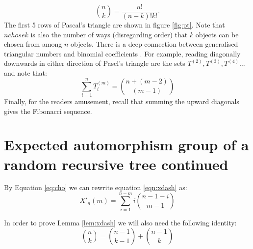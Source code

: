 \documentclass[oneside]{book} %
\theoremstyle{definition}
\numberwithin{equation}{section}
\begin{document}
\[
 {n \choose k} = \frac{n!}{(n-k)!k!}.
\]
The first 5 rows of Pascal's triangle are shown in figure \ref{fig:pt}.  Note that ${n chose k}$ is also the number of ways
(disregarding order) that $k$ objects can be chosen from among $n$ objects.  There is a deep connection between generalised
triangular numbers and binomial coefficients \cite{}. For example, reading diagonally downwards in either direction of Pascl's 
triangle are the sets $T^{(2)}, T^{(3)},T^{(4)}\dots$ and note that:
\begin{equation}\label{eq:cho}
 \sum_{i=1}^{n}T_i^{(m)} = {n + (m-2)\choose(m-1)}
\end{equation}
Finally, for the readers amusement, recall that summing the upward diagonals gives the Fibonacci sequence.

\section{Expected automorphism group of a random recursive tree continued}

By Equation \ref{eq:cho} we can rewrite equation \ref{eqn:xdash} as:
\[ X'_n(m) = \sum_{i=1}^{n-m} i  {n-1-i\choose m-1} \]


In order to prove Lemma \ref{lem:xdash} we will also need the following identity:
\begin{equation}\label{eqn:id1}
{{n}\choose{k}} = {{n-1}\choose{k-1}} + {{n-1}\choose{k}}
\end{equation}
\end{document}
